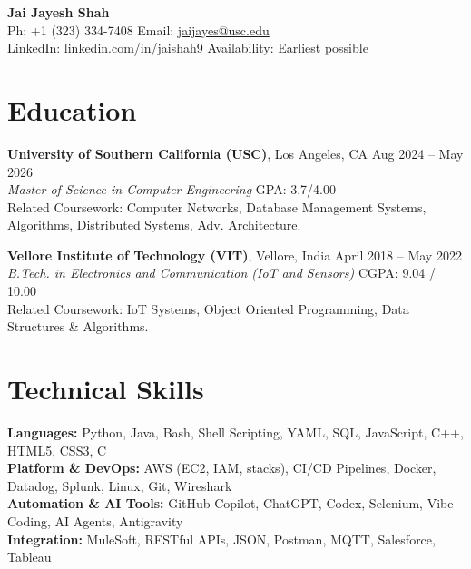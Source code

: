 \documentclass[letterpaper,10pt]{article}
\begin{document}
\begin{center}
    {\LARGE \textbf{Jai Jayesh Shah}} \\
    \vspace{2pt}
    \small
    Ph: +1 (323) 334-7408 \quad Email: \href{mailto:jaijayes@usc.edu}{jaijayes@usc.edu} \\
    LinkedIn: \href{https://www.linkedin.com/in/jaishah9}{linkedin.com/in/jaishah9} \quad Availability: Earliest possible \\
    \vspace{-8pt}
\end{center}

\section*{Education}
\textbf{University of Southern California (USC)}, Los Angeles, CA \hfill Aug 2024 -- May 2026 \\
\textit{Master of Science in Computer Engineering} \hfill GPA: 3.7/4.00 \\
Related Coursework: Computer Networks, Database Management Systems, Algorithms, Distributed Systems, Adv. Architecture.

\vspace{2pt}

\textbf{Vellore Institute of Technology (VIT)}, Vellore, India \hfill April 2018 -- May 2022 \\
\textit{B.Tech. in Electronics and Communication (IoT and Sensors)} \hfill CGPA: 9.04 / 10.00 \\
Related Coursework: IoT Systems, Object Oriented Programming, Data Structures \& Algorithms.

\section*{Technical Skills}
\textbf{Languages:} Python, Java, Bash, Shell Scripting, YAML, SQL, JavaScript, C++, HTML5, CSS3, C \\
\textbf{Platform \& DevOps:} AWS (EC2, IAM, stacks), CI/CD Pipelines, Docker, Datadog, Splunk, Linux, Git, Wireshark \\
\textbf{Automation \& AI Tools:} GitHub Copilot, ChatGPT, Codex, Selenium, Vibe Coding, AI Agents, Antigravity \\
\textbf{Integration:} MuleSoft, RESTful APIs, JSON, Postman, MQTT, Salesforce, Tableau
\end{document}

